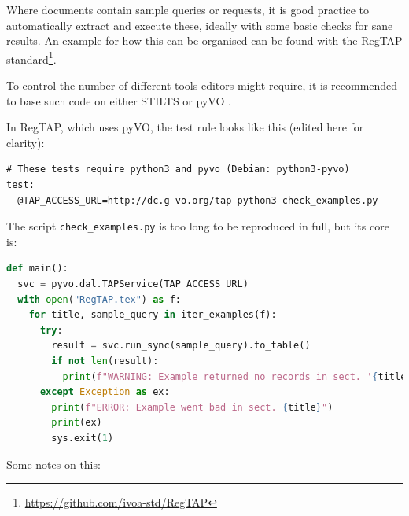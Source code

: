 \documentclass[11pt,a4paper]{ivoa}
\begin{document}
Where documents contain sample queries or requests, it is good practice
to automatically extract and execute these, ideally with some basic
checks for sane results.  An example for how this can be organised can
be found with the RegTAP
standard\footnote{\url{https://github.com/ivoa-std/RegTAP}}.

To control the number of different tools editors might require, it
is recommended to base such code on either STILTS or pyVO
\citep{2014ascl.soft02004G}.

In RegTAP, which uses pyVO, the test rule looks like this
(edited here for clarity):

\begin{lstlisting}[basicstyle=\footnotesize]
# These tests require python3 and pyvo (Debian: python3-pyvo)
test:
  @TAP_ACCESS_URL=http://dc.g-vo.org/tap python3 check_examples.py
\end{lstlisting}

The script \verb|check_examples.py| is too long to be reproduced in
full, but its core is:

\begin{lstlisting}[language=python,basicstyle=\footnotesize]
def main():
  svc = pyvo.dal.TAPService(TAP_ACCESS_URL)
  with open("RegTAP.tex") as f:
    for title, sample_query in iter_examples(f):
      try:
        result = svc.run_sync(sample_query).to_table()
        if not len(result):
          print(f"WARNING: Example returned no records in sect. '{title}'")
      except Exception as ex:
        print(f"ERROR: Example went bad in sect. {title}")
        print(ex)
        sys.exit(1)
\end{lstlisting}

Some notes on this:
\end{document}
